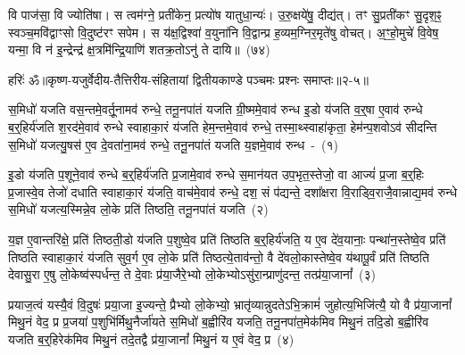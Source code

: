 वि पाज॑सा॒ वि ज्योति॑षा। स त्वम॑ग्ने॒ प्रती॑केन॒ प्रत्यो॑ष यातुधा॒न्यः॑। उ॒रु॒क्षये॑षु॒ दीद्य॑त्। तꣳ सु॒प्रती॑कꣳ सु॒दृश॒ꣴ॒ स्वञ्च॒मवि॑द्वाꣳसो वि॒दुष्ट॑रꣳ सपेम। स य॑क्ष॒द्विश्वा॑ व॒युना॑नि वि॒द्वान्प्र ह॒व्यम॒ग्निर॒मृते॑षु वोचत्। अ॒ꣳ॒हो॒मुचे॑ वि॒वेष॒ यन्मा॒ वि न॑ इ॒न्द्रेन्द्र॑ क्ष॒त्रमि॑न्द्रि॒याणि॑ शतक्र॒तो\-ऽनु॑ ते दायि॥~(७४)\ip

{\anuvakamend[{य॒ह्वीः सम॑ध्व॒राय॑ नो॒ वरु॑णꣳ राज॒ꣴ॒ श्चतु॑श्चत्वारिꣳशच्च}]}%

{हरिः॑ ॐ}{॥कृष्ण-यजुर्वेदीय-तैत्तिरीय-संहितायां द्वितीयकाण्डे पञ्चमः प्रश्नः समाप्तः॥२-५॥}



\setcounter{anuvakam}{0}
स॒मिधो॑ यजति वस॒न्तमे॒वर्तू॒नामव॑ रुन्धे॒ तनू॒नपा॑तं यजति ग्री॒ष्ममे॒वाव॑ रुन्ध इ॒डो य॑जति व॒र्॒\mbox{}षा ए॒वाव॑ रुन्धे ब॒र्॒\mbox{}हिर्य॑जति श॒रद॑मे॒वाव॑ रुन्धे स्वाहाका॒रं य॑जति हेम॒न्तमे॒वाव॑ रुन्धे॒ तस्मा॒थ्\-स्वाहा॑कृता॒ हेम॑न्प॒शवो\-ऽव॑ सीदन्ति स॒मिधो॑ यजत्यु॒षस॑ ए॒व दे॒वता॑ना॒मव॑ रुन्धे॒ तनू॒नपा॑तं यजति य॒ज्ञमे॒वाव॑ रुन्ध~-~(१)\ip

इ॒डो य॑जति प॒शूने॒वाव॑ रुन्धे ब॒र्॒\mbox{}हिर्य॑जति प्र॒जामे॒वाव॑ रुन्धे स॒मान॑यत उप॒भृत॒स्तेजो॒ वा आज्यं॑ प्र॒जा ब॒र्॒\mbox{}हिः प्र॒जास्वे॒व तेजो॑ दधाति स्वाहाका॒रं य॑जति॒ वाच॑मे॒वाव॑ रुन्धे॒ दश॒ सं प॑द्यन्ते॒ दशा᳚क्षरा वि॒राड्वि॒राजै॒वान्नाद्य॒मव॑ रुन्धे स॒मिधो॑ यजत्य॒स्मिन्ने॒व लो॒के प्रति॑ तिष्ठति॒ तनू॒नपा॑तं यजति~(२)\ip

य॒ज्ञ ए॒वान्तरि॑क्षे॒ प्रति॑ तिष्ठती॒डो य॑जति प॒शुष्वे॒व प्रति॑ तिष्ठति ब॒र्॒\mbox{}हिर्य॑जति॒ य ए॒व दे॑व॒यानाः॒ पन्था॑न॒स्तेष्वे॒व प्रति॑ तिष्ठति स्वाहाका॒रं य॑जति सुव॒र्ग ए॒व लो॒के प्रति॑ तिष्ठत्ये॒ताव॑न्तो॒ वै दे॑व\-लो॒का\-स्तेष्वे॒व य॑थापू॒र्वं प्रति॑ तिष्ठति देवासु॒रा ए॒षु लो॒केष्व॑स्पर्धन्त॒ ते दे॒वाः प्र॑या॒जैरे॒भ्यो लो॒केभ्यो\-ऽसु॑रा॒न्प्राणु॑दन्त॒ तत्प्र॑या॒जानां᳚~(३)\ip

प्रयाज॒त्वं यस्यै॒वं वि॒दुषः॑ प्रया॒जा इ॒ज्यन्ते॒ प्रैभ्यो लो॒केभ्यो॒ भ्रातृ॑व्यान्नुदते\-ऽभि॒क्रामं॑ जुहोत्य॒भिजि॑त्यै॒ यो वै प्र॑या॒जानां᳚ मिथु॒नं वेद॒ प्र प्र॒जया॑ प॒शुभि॑र्मिथु॒नैर्जा॑यते स॒मिधो॑ ब॒ह्वीरि॑व यजति॒ तनू॒नपा॑त॒मेक॑मिव मिथु॒नं तदि॒डो ब॒ह्वीरि॑व यजति ब॒र्॒\mbox{}हिरेक॑मिव मिथु॒नं तदे॒तद्वै प्र॑या॒जानां᳚ मिथु॒नं य ए॒वं वेद॒ प्र~(४)\ip

